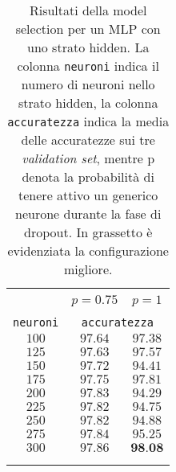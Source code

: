 \vspace*{\fill}
\begin{center}

\begin{table}[]
  \small
  \caption{Risultati della model selection per un MLP con uno strato hidden. La colonna \texttt{neuroni} indica il numero di neuroni nello strato hidden, la colonna \texttt{accuratezza} indica  la media delle accuratezze sui tre \textit{validation set}, mentre p denota la probabilità di tenere attivo un generico neurone durante la fase di dropout. In grassetto è evidenziata la configurazione migliore.}\label{tab:modselmnist}
\begin{center}
\begin{tabular}{@{}cc|c@{}}

\hline\\[-11pt]
\hline\\[-6.5pt]
& $p=0.75$ & $p=1$ \\[5pt]
\hline\\[-11pt]
\texttt{neuroni} & \multicolumn{2}{c}{\texttt{accuratezza}} \\[1pt]
$100$ & $97.64$ & $97.38$ \\ [1pt]
$125$ & $97.63$ & $97.57$ \\ [1pt]
$150$ & $97.72$ & $94.41$ \\ [1pt]
$175$ & $97.75$ & $97.81$ \\ [1pt]
$200$ & $97.83$ & $94.29$ \\ [1pt]
$225$ & $97.82$ & $94.75$ \\ [1pt]
$250$ & $97.82$ & $94.88$ \\ [1pt]
$275$ & $97.84$ & $95.25$ \\ [1pt]
$300$ & $97.86$ & $\textbf{98.08}$ \\ [1pt]
\hline\\[-11pt]
\hline\\[-8pt]
\end{tabular}\\[5pt]
\end{center}
\normalsize
\end{table}
\end{center}

